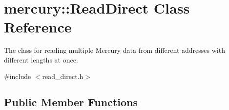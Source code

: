 \hypertarget{classmercury_1_1_read_direct}{}\section{mercury\+:\+:Read\+Direct Class Reference}
\label{classmercury_1_1_read_direct}


The class for reading multiple Mercury data from different addresses with different lengths at once.  




{\ttfamily \#include $<$read\+\_\+direct.\+h$>$}

\subsection*{Public Member Functions}
